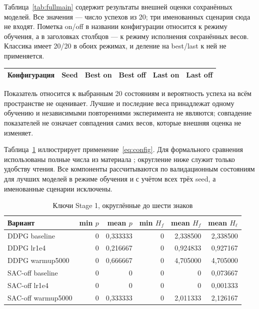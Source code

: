 \label{app:main}
Таблица~\ref{tab:fullmain} содержит результаты внешней оценки сохранённых моделей. Все значения — число успехов из 20; три именованных сценария сюда не входят. Пометка on/off в названии конфигурации относится к режиму обучения, а в заголовках столбцов — к режиму исполнения сохранённых весов. Классика имеет 20/20 в обоих режимах, и деление на best/last к ней не применяется.
\begin{center}\label{tab:fullmain}
\begin{smalltable}\begin{tabularx}{\linewidth}{@{}Xccccc@{}}\toprule
Конфигурация & Seed & Best on & Best off & Last on & Last off\\\midrule

\end{tabularx}\end{smalltable}\end{center}
Показатель относится к выбранным 20 состояниям и вероятность успеха на всём пространстве не оценивает. Лучшие и последние веса принадлежат одному обучению и независимыми повторениями эксперимента не являются; совпадение показателей не означает совпадения самих весов, которые внешняя оценка не изменяет.

\label{app:selection}
Таблица~\ref{tab:keys} иллюстрирует применение~\eqref{eq:config}. Для формального сравнения использованы полные числа из материала ; округление ниже служит только удобству чтения. Все компоненты рассчитываются по валидационным состояниям для лучших моделей в режиме обучения и с учётом всех трёх seed, а именованные сценарии исключены.
\begin{table}[htbp]\caption{Ключи Stage 1, округлённые до шести знаков}\label{tab:keys}
\begin{smalltable}\begin{tabularx}{\linewidth}{@{}Xrrrrr@{}}\toprule
Вариант & min $p$ & mean $p$ & min $H_f$ & mean $H_f$ & mean $H_\ell$\\\midrule
DDPG baseline & 0 & 0,333333 & 0 & 2,338500 & 2,338500\\
DDPG lr1e4 & 0 & 0,216667 & 0 & 0,924833 & 0,927167\\
DDPG warmup5000 & 0 & 0,666667 & 0 & 4,705000 & 4,705000\\
SAC-off baseline & 0 & 0 & 0 & 0 & 0,073667\\
SAC-off lr1e4 & 0 & 0 & 0 & 0 & 0,001333\\
SAC-off warmup5000 & 0 & 0,333333 & 0 & 2,011333 & 2,126167\\\bottomrule
\end{tabularx}\end{smalltable}\end{table}

